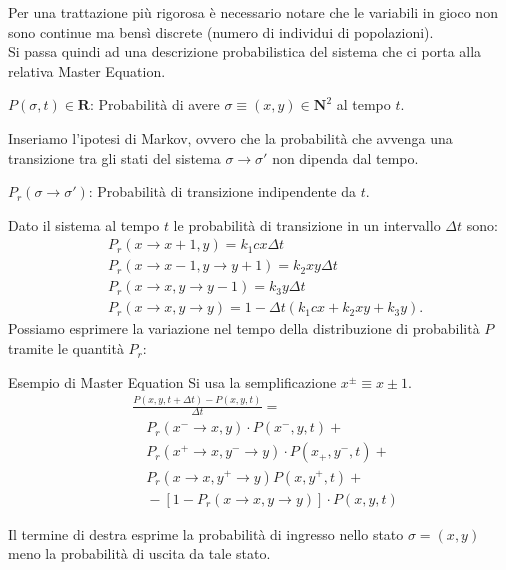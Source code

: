 \noindent
Per una trattazione più rigorosa è necessario notare che le variabili in gioco non sono continue ma bensì discrete (numero di individui di popolazioni).\\
Si passa quindi ad una descrizione probabilistica del sistema che ci porta alla relativa Master Equation.
\begin{center}
    $P(\sigma, t) \in \mathbf{R}$: Probabilità di avere $\sigma \equiv (x,y)\in \mathbf{N}^2$ al tempo $t$.
\end{center}
Inseriamo l'ipotesi di Markov, ovvero che la probabilità che avvenga una transizione tra gli stati del sistema $\sigma \rightarrow \sigma'$ non dipenda dal tempo.
\begin{center}
    $P_r(\sigma\rightarrow\sigma')$: Probabilità di transizione indipendente da $t$.
\end{center}
Dato il sistema al tempo $t$ le probabilità di transizione in un intervallo $\Delta t$ sono:
\[\begin{aligned}
    &P_r(x\to x+1, y) = k_1 c x \Delta t\\
    &P_r(x\to x-1, y \to y+1) = k_2xy\Delta t\\
    &P_r(x\to x,y\to y-1) = k_3 y \Delta t\\
    &P_r(x\to x,y\to y) = 1 - \Delta t \left(k_1cx+ k_2xy + k_3 y\right)
.\end{aligned}\]
Possiamo esprimere la variazione nel tempo della distribuzione di probabilità $P$ tramite le quantità $P_r$:
\begin{redbox}{Esempio di Master Equation}
    Si usa la semplificazione $x^{\pm} \equiv x \pm 1$.
    \begin{equation}
        \begin{aligned}
	    &\frac{P(x,y,t+\Delta  t) - P(x,y,t)}{\Delta  t}  =\\
	    & \quad P_r(x^-\to x, y) \cdot P(x^-,y,t) +\\
	    & \quad P_r(x^+\to x, y^-\to y) \cdot P(x_+,y^-,t) + \\
	    & \quad P_r(x\to x, y^+\to y) P(x,y^+,t) + \\
	    & \quad - \left[1-P_r(x\to x, y\to y)\right]\cdot P(x,y,t) 
        \end{aligned}
    \end{equation}
\end{redbox}
\noindent
Il termine di destra esprime la probabilità di ingresso nello stato $\sigma = (x,y)$ meno la probabilità di uscita da tale stato.
